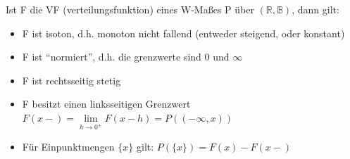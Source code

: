 \documentclass{article}
\begin{document}
	Ist F die VF (verteilungsfunktion) eines W-Maßes P über $(\mathbb{R},\mathbb{B})$, dann gilt:\\
	\begin{itemize}
		\item F ist isoton, d.h. monoton nicht fallend (entweder steigend, oder konstant)
		\item F ist ``normiert'', d.h. die grenzwerte sind 0 und $\infty$
		\item F ist rechtsseitig stetig
		\item F besitzt einen linksseitigen Grenzwert $F(x-) = \lim\limits_{h\to 0^+} F(x-h)=P((-\infty,x))$
		\item Für Einpunktmengen $\{x\}$ gilt: $P(\{x\})=F(x)-F(x-)$
	\end{itemize}
\end{document}
